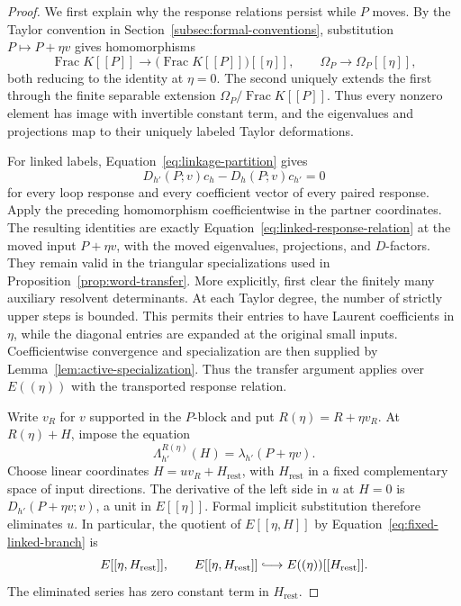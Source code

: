 \documentclass[11pt]{article}
\theoremstyle{definition}
\theoremstyle{remark}
\numberwithin{equation}{section}
\begin{document}
\begin{proof}
We first explain why the response relations persist while $P$ moves.
By the Taylor convention in Section~\ref{subsec:formal-conventions},
substitution $P\mapsto P+\eta v$ gives homomorphisms
\[
 \operatorname{Frac}K[[P]]
 \longrightarrow \bigl(\operatorname{Frac}K[[P]]\bigr)[[\eta]],
 \qquad
 \Omega_P\longrightarrow\Omega_P[[\eta]],
\]
both reducing to the identity at $\eta=0$. The second uniquely
extends the first through the finite separable extension
$\Omega_P/\operatorname{Frac}K[[P]]$. Thus every nonzero element
has image with invertible constant term, and the eigenvalues and
projections map to their uniquely labeled Taylor deformations.

For linked labels, Equation~\eqref{eq:linkage-partition} gives
\begin{equation}
 D_{h'}(P;v)c_h-D_h(P;v)c_{h'}=0
 \label{eq:linked-response-relation}
\end{equation}
for every loop response and every coefficient vector of every paired
response.  Apply the preceding homomorphism coefficientwise in the
partner coordinates.  The resulting identities are exactly
Equation~\eqref{eq:linked-response-relation} at the moved input
$P+\eta v$, with the moved eigenvalues, projections, and $D$-factors.
They remain valid in the triangular specializations used in
Proposition~\ref{prop:word-transfer}.  More explicitly, first clear the
finitely many auxiliary resolvent determinants.  At each Taylor degree,
the number of strictly upper steps is bounded.  This permits their
entries to have Laurent coefficients in $\eta$, while the diagonal
entries are expanded at the original small inputs.  Coefficientwise
convergence and specialization are then supplied by
Lemma~\ref{lem:active-specialization}.  Thus the transfer argument
applies over $E((\eta))$ with the transported response relation.

Write $v_R$ for $v$ supported in the $P$-block and put
$R(\eta)=R+\eta v_R$.  At $R(\eta)+H$, impose the equation
\begin{equation}
 \Lambda_{h'}^{R(\eta)}(H)=\lambda_{h'}(P+\eta v).
 \label{eq:fixed-linked-branch}
\end{equation}
Choose linear coordinates $H=u v_R+H_{\mathrm{rest}}$, with
$H_{\mathrm{rest}}$ in a fixed complementary space of input directions.
The derivative of the left side in $u$ at $H=0$ is
$D_{h'}(P+\eta v;v)$, a unit in $E[[\eta]]$.  Formal implicit
substitution therefore eliminates $u$.  In particular, the quotient
of $E[[\eta,H]]$ by Equation~\eqref{eq:fixed-linked-branch} is
\begin{equation}
 E[[\eta,H_{\mathrm{rest}}]],
 \qquad
 E[[\eta,H_{\mathrm{rest}}]]
 \lhook\joinrel\longrightarrow
 E((\eta))[[H_{\mathrm{rest}}]].
 \label{eq:linkage-quotient-injection}
\end{equation}
The eliminated series has zero constant term in $H_{\mathrm{rest}}$.


\end{proof}
\end{document}
